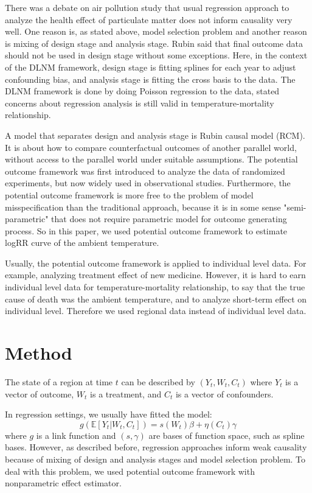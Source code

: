 \documentclass[12pt]{article}
\begin{document}
There was a debate on air pollution study 
that usual regression approach to analyze the health effect of particulate matter 
does not inform causality very well\cite{dominici2019sci}.
One reason is, as stated above, model selection problem
and another reason is mixing of design stage and analysis stage.
Rubin said that final outcome data should not be used in design stage without some exceptions\cite{rubin2008}.
Here, in the context of the DLNM framework,
design stage is fitting splines for each year to adjust confounding bias, 
and analysis stage is fitting the cross basis to the data.
The DLNM framework is done by doing Poisson regression to the data,
stated concerns about regression analysis is still valid in temperature-mortality relationship.

A model that separates design and analysis stage is Rubin causal model (RCM)\cite{holland1986}.
It is about how to compare counterfactual outcomes of another parallel world, 
without access to the parallel world under suitable assumptions.
The potential outcome framework was first introduced 
to analyze the data of randomized experiments\cite{rubin1974},
but now widely used in observational studies\cite{wu2020sciadv}.
Furthermore, the potential outcome framework is more free 
to the problem of model misspecification than the traditional approach, 
because it is in some sense "semi-parametric" 
that does not require parametric model for outcome generating process.\cite{angrist2018} 
So in this paper, we used potential outcome framework 
to estimate logRR curve of the ambient temperature.

Usually, the potential outcome framework is applied to individual level data. 
For example, analyzing treatment effect of new medicine. 
However, it is hard to earn individual level data for temperature-mortality relationship,
to say that the true cause of death was the ambient temperature, 
and to analyze short-term effect on individual level. 
Therefore we used regional data instead of individual level data.

\section{Method}

The state of a region at time $t$ can be described by $(Y_t, W_t, C_t)$ 
where $Y_t$ is a vector of outcome, $W_t$ is a treatment, and $C_t$ is a vector of confounders.

In regression settings, we usually have fitted the model:
\[
	g\left( \mathbb{E}\left[ Y_t \lvert W_t, C_t \right] \right) = s(W_t)\beta + \eta(C_t)\gamma
\]
where $g$ is a link function and $(s,\gamma)$ are bases of function space, such as spline bases.
However, as described before, regression approaches inform weak causality 
because of mixing of design and analysis stages and model selection problem.
To deal with this problem, we used potential outcome framework with nonparametric effect estimator.
\end{document}

